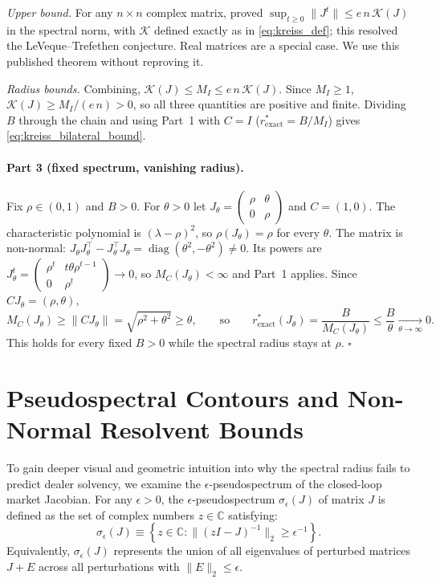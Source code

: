 \documentclass[12pt]{article}
\theoremstyle{definition}
\theoremstyle{remark}
\begin{document}
\emph{Upper bound.} For any $n\times n$ complex matrix, \citet{spijker1991} proved $\sup_{t\ge0}\|J^t\|\le e\,n\,\mathcal{K}(J)$ in the spectral norm, with $\mathcal{K}$ defined exactly as in \eqref{eq:kreiss_def}; this resolved the LeVeque--Trefethen conjecture. Real matrices are a special case. We use this published theorem without reproving it.

\emph{Radius bounds.} Combining, $\mathcal{K}(J)\le M_I\le e\,n\,\mathcal{K}(J)$. Since $M_I\ge1$, $\mathcal{K}(J)\ge M_I/(e\,n)>0$, so all three quantities are positive and finite. Dividing $B$ through the chain and using Part~1 with $C=I$ ($r^*_{\text{exact}}=B/M_I$) gives \eqref{eq:kreiss_bilateral_bound}.

\paragraph{Part 3 (fixed spectrum, vanishing radius).}
Fix $\rho\in(0,1)$ and $B>0$. For $\theta>0$ let $J_\theta=\left(\begin{smallmatrix}\rho&\theta\\0&\rho\end{smallmatrix}\right)$ and $C=(1,0)$. The characteristic polynomial is $(\lambda-\rho)^2$, so $\rho(J_\theta)=\rho$ for every $\theta$. The matrix is non-normal: $J_\theta J_\theta^\top-J_\theta^\top J_\theta=\operatorname{diag}(\theta^2,-\theta^2)\neq0$. Its powers are $J_\theta^t=\left(\begin{smallmatrix}\rho^t&t\theta\rho^{t-1}\\0&\rho^t\end{smallmatrix}\right)\to0$, so $M_C(J_\theta)<\infty$ and Part~1 applies. Since $CJ_\theta=(\rho,\theta)$,
\begin{equation}
M_C(J_\theta)\ge\|CJ_\theta\|=\sqrt{\rho^2+\theta^2}\ge\theta,
\qquad\text{so}\qquad
r^*_{\text{exact}}(J_\theta)=\frac{B}{M_C(J_\theta)}\le\frac{B}{\theta}\xrightarrow[\theta\to\infty]{}0 .
\end{equation}
This holds for every fixed $B>0$ while the spectral radius stays at $\rho$. \hfill$\square$

\section{Pseudospectral Contours and Non-Normal Resolvent Bounds}
\label{ia:pseudospectra}
To gain deeper visual and geometric intuition into why the spectral radius fails to predict dealer solvency, we examine the $\epsilon$-pseudospectrum of the closed-loop market Jacobian. For any $\epsilon > 0$, the $\epsilon$-pseudospectrum $\sigma_\epsilon(J)$ of matrix $J$ is defined as the set of complex numbers $z \in \mathbb{C}$ satisfying:
\begin{equation}
\sigma_\epsilon(J) \equiv \left\{ z \in \mathbb{C} : \|(zI - J)^{-1}\|_2 \ge \epsilon^{-1} \right\}.
\label{eq:pseudospectrum_def}
\end{equation}
Equivalently, $\sigma_\epsilon(J)$ represents the union of all eigenvalues of perturbed matrices $J + E$ across all perturbations with $\|E\|_2 \le \epsilon$.
\end{document}
